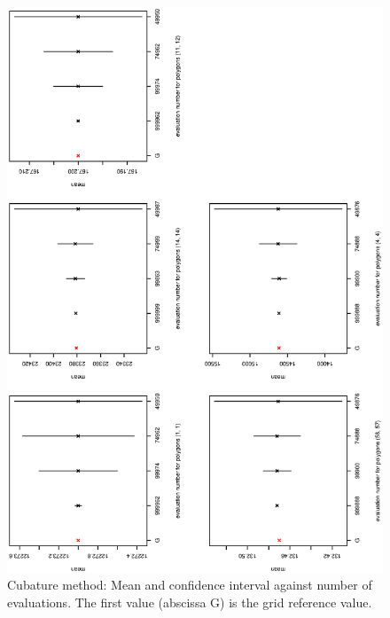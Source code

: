 \begin{figure}
    \begin{center}
    \includegraphics[angle=-90,width=15cm]{./VignetteDir/graphics/chapExample/ICneval.eps}
\caption{Cubature method: Mean and confidence interval against 
 number of evaluations. The first value (abscissa G) is the grid reference value.}\label{fig:ICneval}



\end{center}
\end{figure}
